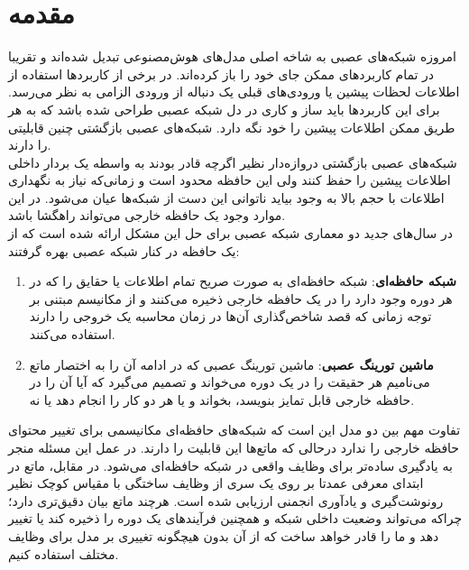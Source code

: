 \chapter{مقدمه}

امروزه شبکه‌های عصبی به شاخه اصلی مدل‌های هوش‌مصنوعی تبدیل شده‌‌اند و تقریبا در تمام کاربردهای ممکن جای خود را باز کرده‌اند. در برخی از کاربردها استفاده از اطلاعات لحظات پیشین یا ورودی‌های قبلی یک دنباله از ورودی الزامی به نظر می‌رسد. برای این کاربردها باید ساز و کاری در دل شبکه عصبی طراحی شده باشد که به هر طریق ممکن اطلاعات پیشین را خود نگه دارد. شبکه‌های عصبی بازگشتی چنین قابلیتی را دارند.
\\

شبکه‌های عصبی بازگشتی دروازه‌دار نظیر  اگرچه قادر بودند به واسطه یک بردار داخلی اطلاعات پیشین را حفظ کنند ولی این حافظه محدود است و زمانی‌که نیاز به نگهداری اطلاعات با حجم بالا به وجود بیاید ناتوانی این دست از شبکه‌ها عیان می‌شود. در این موارد وجود یک حافظه خارجی می‌تواند راهگشا باشد.
\\

در سال‌های جدید دو معماری شبکه عصبی برای حل این مشکل ارائه شده است که از یک حافظه در کنار شبکه عصبی بهره گرفتند:
\begin{enumerate}
\item \textbf{شبکه حافظه‌ای}: شبکه حافظه‌ای به صورت صریح تمام اطلاعات یا حقایق را که در هر دوره وجود دارد را در یک حافظه خارجی ذخیره می‌کنند و از مکانیسم مبتنی بر توجه زمانی که قصد شاخص‌گذاری آن‌ها در زمان محاسبه یک خروجی را دارند استفاده می‌کنند.
\item \textbf{ماشین‌ تورینگ عصبی}: ماشین تورینگ عصبی  که در ادامه آن را به اختصار ماتع می‌نامیم هر حقیقت را در یک دوره می‌خواند و تصمیم می‌گیرد که آیا آن را در حافظه خارجی قابل تمایز بنویسد، بخواند و یا هر دو کار را انجام دهد یا نه.\cite{gulcehre2018dynamic}
\end{enumerate}

تفاوت مهم بین دو مدل این است که شبکه‌های حافظه‌ای مکانیسمی برای تغییر محتوای حافظه خارجی را ندارد درحالی که ماتع‌ها این قابلیت را دارند. در عمل این مسئله منجر به یادگیری ساده‌تر برای وظایف واقعی در شبکه حافظه‌ای می‌شود. در مقابل، ماتع در ابتدای معرفی عمدتا بر روی یک سری از وظایف ساختگی  با مقیاس کوچک نظیر رونوشت‌گیری و یادآوری انجمنی ارزیابی شده است. هرچند ماتع بیان دقیق‌تری دارد؛ چراکه می‌تواند وضعیت داخلی شبکه و همچنین فرآیند‌های یک دوره را ذخیره کند یا تغییر دهد و ما را قادر خواهد ساخت که از آن بدون هیچگونه تغییری بر مدل برای وظایف مختلف استفاده کنیم.\cite{gulcehre2018dynamic}
\\

